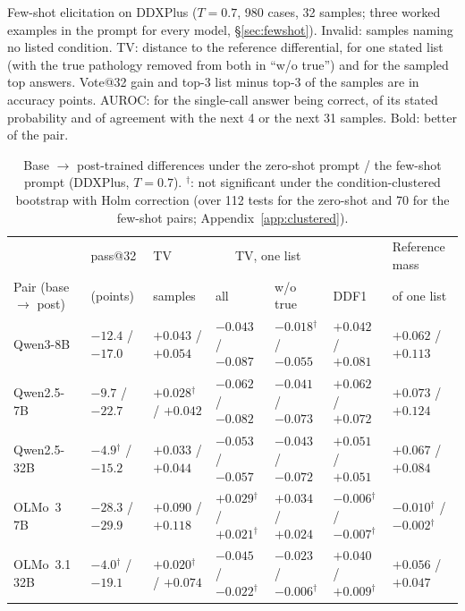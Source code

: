 \documentclass[11pt]{article}
\begin{document}
\begin{table}[t]
\begin{adjustbox}{max width=\textwidth}
\end{adjustbox}
\caption{Few-shot elicitation on DDXPlus ($T{=}0.7$, 980 cases, 32 samples; three worked examples in the prompt for every model, \S\ref{sec:fewshot}). Invalid: samples naming no listed condition. TV: distance to the reference differential, for one stated list (with the true pathology removed from both in ``w/o true'') and for the sampled top answers. Vote@32 gain and top-3 list minus top-3 of the samples are in accuracy points. AUROC: for the single-call answer being correct, of its stated probability and of agreement with the next 4 or the next 31 samples. Bold: better of the pair.}
\label{tab:fewshot}
\end{table}

\begin{table}[t]
\centering
\begin{adjustbox}{max width=\textwidth}
\begin{tabular}{lllllll}
\toprule
 & pass@32 & TV & \multicolumn{2}{c}{TV, one list} & & Reference mass \\
Pair (base $\rightarrow$ post) & (points) & samples & all & w/o true & DDF1 & of one list \\
\midrule
Qwen3-8B & $-12.4$ / $-17.0$ & $+0.043$ / $+0.054$ & $-0.043$ / $-0.087$ & $-0.018$$^{\dagger}$ / $-0.055$ & $+0.042$ / $+0.081$ & $+0.062$ / $+0.113$ \\
Qwen2.5-7B & $-9.7$ / $-22.7$ & $+0.028$$^{\dagger}$ / $+0.042$ & $-0.062$ / $-0.082$ & $-0.041$ / $-0.073$ & $+0.062$ / $+0.072$ & $+0.073$ / $+0.124$ \\
Qwen2.5-32B & $-4.9$$^{\dagger}$ / $-15.2$ & $+0.033$ / $+0.044$ & $-0.053$ / $-0.057$ & $-0.043$ / $-0.072$ & $+0.051$ / $+0.051$ & $+0.067$ / $+0.084$ \\
OLMo~3 7B & $-28.3$ / $-29.9$ & $+0.090$ / $+0.118$ & $+0.029$$^{\dagger}$ / $+0.021$$^{\dagger}$ & $+0.034$ / $+0.024$ & $-0.006$$^{\dagger}$ / $-0.007$$^{\dagger}$ & $-0.010$$^{\dagger}$ / $-0.002$$^{\dagger}$ \\
OLMo~3.1 32B & $-4.0$$^{\dagger}$ / $-19.1$ & $+0.020$$^{\dagger}$ / $+0.074$ & $-0.045$ / $-0.022$$^{\dagger}$ & $-0.023$ / $-0.006$$^{\dagger}$ & $+0.040$ / $+0.009$$^{\dagger}$ & $+0.056$ / $+0.047$ \\
\bottomrule
\end{tabular}
\end{adjustbox}
\caption{Base $\rightarrow$ post-trained differences under the zero-shot prompt / the few-shot prompt (DDXPlus, $T{=}0.7$). $^{\dagger}$: not significant under the condition-clustered bootstrap with Holm correction (over 112 tests for the zero-shot and 70 for the few-shot pairs; Appendix~\ref{app:clustered}).}
\label{tab:fewshotdiff}
\end{table}
\end{document}
